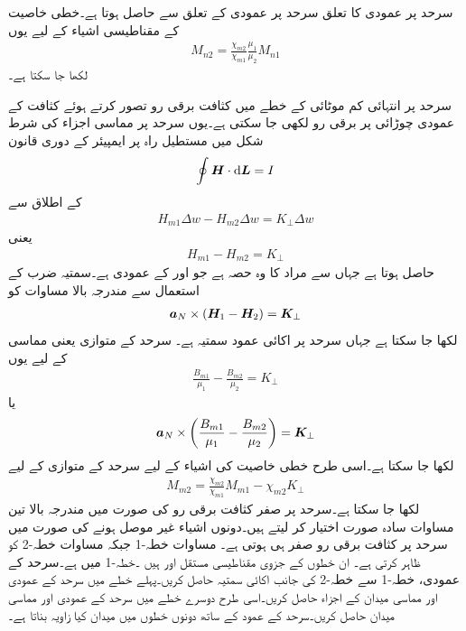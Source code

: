 سرحد پر عمودی  کا تعلق سرحد پر عمودی  کے تعلق سے حاصل ہوتا ہے۔خطی خاصیت کے مقناطیسی اشیاء کے لیے یوں
\begin{align}
M_{n2}=\frac{\chi_{m2}}{\chi_{m1}}\frac{\mu_1}{\mu_2}M_{n1}
\end{align}
لکھا جا سکتا ہے۔

سرحد پر انتہائی کم موٹائی کے خطے میں کثافت برقی رو  تصور کرتے ہوئے کثافت کے عمودی  چوڑائی پر برقی رو  لکھی جا سکتی ہے۔یوں سرحد پر مماسی اجزاء کی شرط شکل میں مستطیل راہ پر ایمپیئر کے دوری قانون
\begin{align*}
\oint \kvec{H} \cdot \dif \kvec{L}=I
\end{align*}
کے اطلاق سے
\begin{align*}
H_{m1} \Delta w -H_{m2}\Delta w=K_\perp \Delta w
\end{align*}
یعنی
\begin{align}
H_{m1} -H_{m2}=K_\perp
\end{align}
 حاصل ہوتا ہے جہاں  سے مراد  کا وہ حصہ ہے جو  اور  کے عمودی ہے۔سمتیہ ضرب کے استعمال سے مندرجہ بالا مساوات کو
\begin{align}
{\boldsymbol{a}}_N \times \left({{\boldsymbol{H}}}_1-{{\boldsymbol{H}}}_2 \right)  ={{\boldsymbol{K}}}_{\perp}
\end{align}
لکھا جا سکتا ہے جہاں  سرحد پر  اکائی  عمود سمتیہ  ہے۔ سرحد کے متوازی یعنی مماسی   کے لیے یوں
\begin{align}
\frac{B_{m1}}{\mu_1}-\frac{B_{m2}}{\mu_2}=K_\perp
\end{align}
یا
\begin{align}
{\boldsymbol{a}}_N \times \left(\frac{B_{m1}}{\mu_1}-\frac{B_{m2}}{\mu_2}\right)={{\boldsymbol{K}}}_\perp
\end{align}
لکھا جا سکتا ہے۔اسی طرح خطی خاصیت کی اشیاء کے لیے سرحد کے متوازی  کے لیے
\begin{align}
M_{m2}=\frac{\chi_{m2}}{\chi_{m1}} M_{m1}-\chi_{m2} K_\perp
\end{align}
لکھا جا سکتا ہے۔سرحد پر صفر کثافت برقی رو کی صورت میں مندرجہ بالا تین مساوات سادہ صورت اختیار کر لیتے ہیں۔دونوں اشیاء غیر موصل ہونے کی صورت میں سرحد پر کثافت برقی رو صفر ہی ہوتی ہے۔
مساوات  خطہ-1 جبکہ مساوات  خطہ-2 کو ظاہر کرتی ہے۔ ان خطوں کے جزوی مقناطیسی مستقل  اور  ہیں ۔خطہ-1 میں  ہے۔سرحد کے عمودی، خطہ-1 سے خطہ-2 کی جانب  اکائی سمتیہ  حاصل کریں۔پہلے خطے  میں سرحد کے عمودی اور مماسی میدان کے اجزاء حاصل کریں۔اسی طرح دوسرے خطے میں سرحد کے عمودی اور مماسی میدان حاصل کریں۔سرحد کے عمود کے ساتھ دونوں خطوں میں میدان کیا زاویہ بناتا ہے۔

